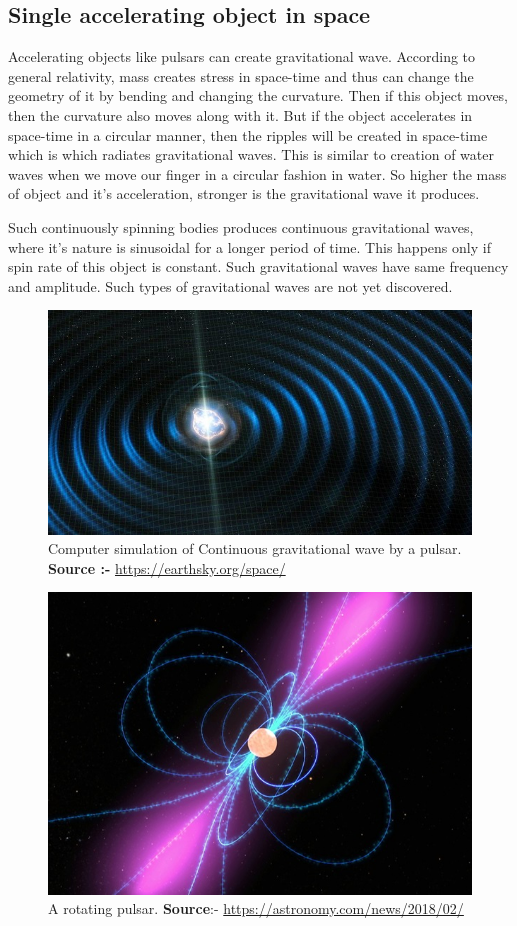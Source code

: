 \subsection{Single accelerating object in space}
 Accelerating objects like pulsars can create gravitational wave. According to general relativity, mass creates stress in space-time and thus can change the geometry of it by bending and changing the curvature. Then if this object moves, then the curvature also moves along with it. But if the object accelerates in space-time in a circular manner, then the ripples will be created in space-time which is which radiates gravitational waves. This is similar to creation of water waves when we move our finger in a circular fashion in water. So higher the mass of object and it's acceleration, stronger is the gravitational wave it produces.
 
 Such continuously spinning bodies produces continuous gravitational waves, where it's nature is sinusoidal for a longer period of time. This happens only if spin rate of this object is constant. Such gravitational waves have same frequency and amplitude. Such types of gravitational waves are not yet discovered.\\


\begin{figure}[h]
    \centering
    \includegraphics[scale = 0.35]{images.tex/continuous_gw.jpg}
    \caption{Computer simulation of Continuous gravitational wave by a pulsar. \\
    \textbf{Source :-} \url{https://earthsky.org/space/}}
\end{figure}

\begin{figure}[h]
    \centering
    \includegraphics[scale = 0.38]{images.tex/pulsar.jpg}
    \caption{A rotating pulsar.   \textbf{Source}:- \url{https://astronomy.com/news/2018/02/}}
\end{figure}

\pagebreak
